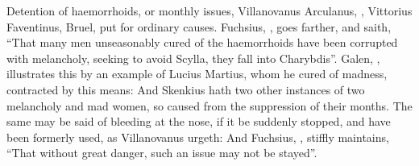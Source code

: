 Detention of haemorrhoids, or monthly issues, Villanovanus
 Arculanus,
, Vittorius Faventinus,
 Bruel, \etc{} put for
ordinary causes. Fuchsius, , goes
farther, and saith, \enquote{That many men unseasonably cured of
the haemorrhoids have been corrupted with melancholy, seeking to avoid Scylla,
they fall into Charybdis}. Galen, , illustrates this by an example of Lucius Martius, whom he cured of
madness, contracted by this means: And Skenkius hath two
other instances of two melancholy and mad women, so caused from the suppression
of their months. The same may be said of bleeding at the nose, if it be
suddenly stopped, and have been formerly used, as
Villanovanus urgeth: And Fuchsius,
, stiffly maintains, \enquote{That
without great danger, such an issue may not be stayed}.

